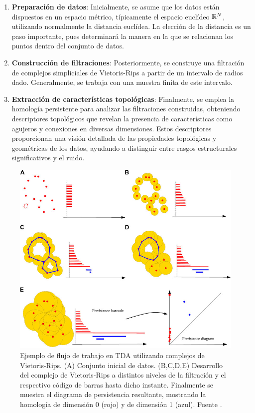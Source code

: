 \begin{enumerate}
	\item \textbf{Preparación de datos}: Inicialmente, se asume que los datos
	están dispuestos en un espacio métrico, típicamente el espacio euclídeo $\mathbb{R}^{N}$,
	utilizando normalmente la distancia euclídea. La elección de la distancia es
	un paso importante, pues determinará la manera en la que se relacionan los
	puntos dentro del conjunto de datos.
	
	\item \textbf{Construcción de filtraciones}: Posteriormente, se construye una
	filtración de complejos simpliciales de Vietoris-Rips a partir de un
	intervalo de radios dado. Generalmente, se trabaja con una muestra finita de
	este intervalo.
	
	\item \textbf{Extracción de características topológicas}: Finalmente, se
	emplea la homología persistente para analizar las filtraciones construidas, obteniendo
	descriptores topológicos que revelan la presencia de características como agujeros
	y conexiones en diversas dimensiones. Estos descriptores proporcionan una
	visión detallada de las propiedades topológicas y geométricas de los datos, ayudando
	a distinguir entre rasgos estructurales significativos y el ruido.
\end{enumerate}

\begin{figure}[h]
	\centering
	\includegraphics[width=130mm]{img/persistent-homology.jpg}
	\caption{Ejemplo de flujo de trabajo en TDA utilizando complejos de Vietoris-Rips.
		(A) Conjunto inicial de datos. (B,C,D,E) Desarrollo del complejo de Vietoris-Rips
		a distintos niveles de la filtración y el respectivo código de barras hasta
		dicho instante. Finalmente se muestra el diagrama de persistencia resultante,
		mostrando la homología de dimensión 0 (rojo) y de dimensión 1 (azul). Fuente \cite{chazal2021introduction}.}
	\label{fig:tda-workflow}
\end{figure}

